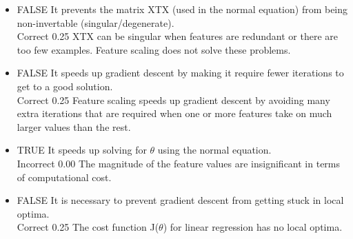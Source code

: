\documentclass[11pt]{article} %
\begin{document}
\begin{itemize}
\item FALSE It prevents the matrix XTX (used in the normal equation) from being non-invertable (singular/degenerate).	
\\Correct	0.25	 XTX can be singular when features are redundant or there are too few examples. Feature scaling does not solve these problems.
\item  FALSE It speeds up gradient descent by making it require fewer iterations to get to a good solution.	
\\Correct	0.25	 Feature scaling speeds up gradient descent by avoiding many extra iterations that are required when one or more features take on much larger values than the rest.
\item  TRUE It speeds up solving for $\theta$ using the normal equation.	
\\Incorrect	0.00	 The magnitude of the feature values are insignificant in terms of computational cost.
\item  FALSE It is necessary to prevent gradient descent from getting stuck in local optima.	
\\Correct	0.25	 The cost function J($\theta$) for linear regression has no local optima.
\end{itemize}
	
\end{document}
